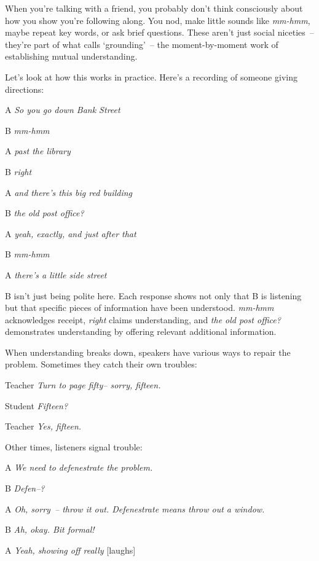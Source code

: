 When you're talking with a friend, you probably don't think consciously about how you show you're following along. You nod, make little sounds like \textit{mm-hmm}, maybe repeat key words, or ask brief questions. These aren't just social niceties~-- they're part of what \citet{clark1991} calls `grounding'~-- the moment-by-moment work of establishing mutual understanding.

Let's look at how this works in practice. Here's a recording of someone giving directions:

\ea
\begin{dialogue}
\item[A] \textit{So you go down Bank Street}
\item[B] \textit{mm-hmm}
\item[A] \textit{past the library}
\item[B] \textit{right}
\item[A] \textit{and there's this big red building}
\item[B] \textit{the old post office?}
\item[A] \textit{yeah, exactly, and just after that}
\item[B] \textit{mm-hmm}
\item[A] \textit{there's a little side street}
\end{dialogue}
\z

B isn't just being polite here. Each response shows not only that B is listening but that specific pieces of information have been understood. \textit{mm-hmm} acknowledges receipt, \textit{right} claims understanding, and \textit{the old post office?} demonstrates understanding by offering relevant additional information.

When understanding breaks down, speakers have various ways to repair the problem. Sometimes they catch their own troubles:

\ea
\begin{dialogue}
\item[Teacher] \textit{Turn to page fifty-- sorry, fifteen.}
\item[Student] \textit{Fifteen?}
\item[Teacher] \textit{Yes, fifteen.}
\end{dialogue}
\z

Other times, listeners signal trouble:

\ea
\begin{dialogue}
\item[A] \textit{We need to defenestrate the problem.}
\item[B] \textit{Defen--?}
\item[A] \textit{Oh, sorry~-- throw it out. Defenestrate means throw out a window.}
\item[B] \textit{Ah, okay. Bit formal!}
\item[A] \textit{Yeah, showing off really} [laughs]
\end{dialogue}
\z

